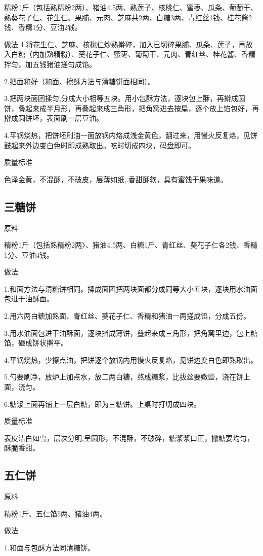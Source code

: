 \documentclass{ctexbook}
\begin{document}
精粉1斤（包括熟精粉2两）、猪油4.5两、熟莲子、核桃仁、蜜枣、瓜条、葡萄干、熟葵花子仁、花生仁、果脯、元肉、芝麻共2两、白糖3两、青红丝1钱、桂花酱2钱、香精1分、豆油2钱。

做法
1.将花生仁、芝麻、核桃仁炒熟擀碎，加入已切碎果脯、瓜条、莲子，再放入白糖（内加熟精粉）、葵花子仁、蜜枣、葡萄干、元肉、青红丝、桂花酱、香精拌匀，加五钱猪油搓匀成馅。

2.把面和好（和面、擦酥方法与清糖饼面相同）。

3.把两块面团揉匀,分成大小相等五块。用小包酥方法，逐块包上酥，再擀成圆饼，叠起来成半月形，再叠起来成三角形，把角窝进去按扁，逐个放上馅包好，再擀成圆饼坯，表面刷一层豆油。

4.平锅烧热，把饼坯刷油一面放锅内烙成浅金黄色，翻过来，用慢火反复烙，见饼鼓起来外边变白色时即成熟取出。吃时切成四块，码盘即可。

质量标准

色泽金黄，不混酥，不破皮，层薄如纸,.香甜酥软，具有蜜饯干果味道。
\subsection{三糖饼}
原料

精粉1斤（包括熟精粉2两〉、猪油4.5两、白糖1斤、青红丝、葵花子仁各2钱、香精1分、豆油4钱。

做法

1.和面方法与清糖饼相同。揉成面团把两块面都分成同等大小五块，逐块用水油面包进干油酥面。

2.用六两白糖加熟面、青红丝、葵花子仁、香精和猪油一两搓成馅，分成五份。

3.用水油面包进干油酥面，逐块擀成薄饼，叠起来成三角形，把角窝里边，包上糖馅，砸成饼状擀平。

4.平锅烧热，少擦点油，把饼逐个放锅内用慢火反复烙，见饼边变白色即熟取出。

5.勺要刷净，放炉上加点水，放二两白糖，熬成糖浆，比拔丝要嫩些，浇在饼上面，浇匀。

6.糖浆上面再铺上一层白糖，即为三糖饼。上桌时打切成四块。

质量标准

表皮洁白如雪，层次分明,呈圆形，不混酥，不破碎，糖浆浆口正，撒糖要均匀，酥脆香甜。
\subsection{五仁饼}
原料

精粉1斤、五仁馅5两、猪油4两。

做法

1.和面与包酥方法同清糖饼。
\end{document}
